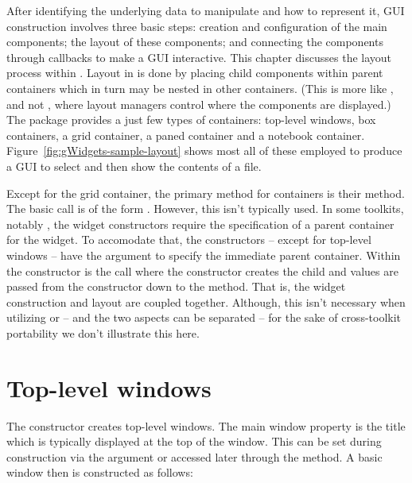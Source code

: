 After identifying the underlying data to manipulate and how to
represent it, GUI construction involves three basic steps: creation
and configuration of the main components; the layout of these
components; and connecting the components through callbacks to make a GUI interactive. This
chapter discusses the layout process within . Layout in
 is done by placing child components within parent
containers which in turn may be nested in other containers. (This is
more like \GTK, and not \Qt, where layout managers control where the
components are displayed.) The  package provides a just
few types of containers: top-level windows, box containers, a grid
container, a paned container and  a notebook
container. Figure~\ref{fig:gWidgets-sample-layout} shows most all of
these employed to produce a GUI to select and then show the contents of a file.


Except for the grid container, the primary method for containers is
their  method. The basic call is of the form
. However, this isn't
typically used. In some toolkits, notably , the widget
constructors require the specification of a parent container for the
widget. To accomodate that, the  constructors --
except for top-level windows -- have the argument 
to specify the immediate parent container.  Within the constructor is
the call  where the constructor
creates the child and   values are passed from the
constructor down to the  method. That is, the widget
construction and layout are coupled together. Although, this isn't
necessary when utilizing  or  -- and the two
aspects can be separated -- for the sake of cross-toolkit portability
we don't illustrate this here.




\section{Top-level windows}
\label{sec:gWidgets-top-level-windows}

The  constructor creates top-level windows. The
main window property is the title which is typically displayed at the
top of the window. This can be set during construction via the
 argument or accessed later through the
 method. A basic window then is constructed as follows:

